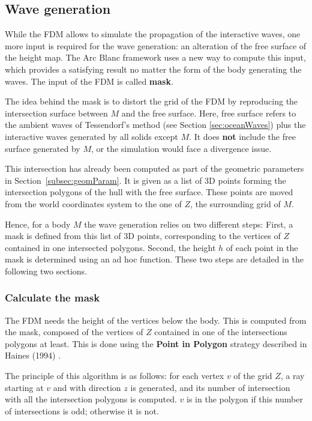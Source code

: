 \documentclass[11pt]{article}
\def\Framework{The Arc Blanc framework\xspace}
\begin{document}
\subsection{Wave generation}
\label{subsec:mask}
While the FDM allows to simulate the propagation of the interactive waves, one more input is required for the wave generation: an alteration of the free surface of the height map.
\Framework uses a new way to compute this input, which provides a satisfying result no matter the form of the body generating the waves.
The input of the FDM is called \textbf{mask}.

The idea behind the mask is to distort the grid of the FDM by reproducing the intersection surface between $M$ and the free surface.
Here, free surface refers to the ambient waves of Tessendorf's method (see Section \ref{sec:oceanWaves}) plus the interactive waves generated by all solids except $M$.
It does \textbf{not} include the free surface generated by $M$, or the simulation would face a divergence issue.

This intersection has already been computed as part of the geometric parameters in Section~\ref{subsec:geomParam}.
It is given as a list of 3D points forming the intersection polygons of the hull with the free surface.
These points are moved from the world coordinates system to the one of $Z$, the surrounding grid of $M$.

Hence, for a body $M$ the wave generation relies on two different steps:
First, a mask is defined from this list of 3D points, corresponding to the vertices of $Z$ contained in one intersected polygons.
Second, the height $h$ of each point in the mask is determined using an ad hoc function.
These two steps are detailed in the following two sections.

\subsubsection{Calculate the mask}
The FDM needs the height of the vertices below the body.
This is computed from the mask, composed of the vertices of $Z$ contained in one of the intersections polygons at least.
This is done using the \textbf{Point in Polygon} strategy described in Haines (1994) \cite{hainesPointPolygonStrategies1994}.

The principle of this algorithm is as follows:
for each vertex $v$ of the grid $Z$, a ray starting at $v$ and with direction $z$ is generated, and its number of intersection with all the intersection polygons is computed.
$v$ is in the polygon if this number of intersections is odd; otherwise it is not.
\end{document}
